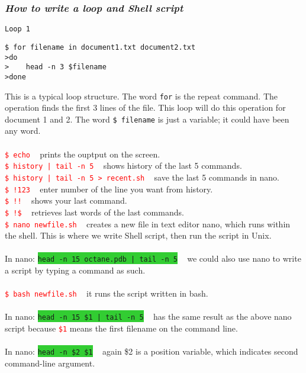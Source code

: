 \documentclass{article}
\begin{document}
{\subsubsection{\small\textsl{How to write a loop and Shell script }}
\texttt{Loop 1}
\begin{lstlisting}
$ for filename in document1.txt document2.txt
>do
>    head -n 3 $filename
>done
\end{lstlisting}
This is a typical loop structure. The word \texttt{for} is the repeat command. The operation finds the first 3 lines of the file. This loop will do this operation for document 1 and 2. The word \texttt{\$ filename} is just a variable; it could have been any word.\\
\\
\textcolor{red}{\texttt{\$ echo}} ~ prints the ouptput on the screen.\\
\textcolor{red}{\texttt{\$ history | tail -n 5}} ~ shows history of the last 5 commands.\\
\textcolor{red}{\texttt{\$ history | tail -n 5 > recent.sh}} ~ save the last 5 commands in nano.\\
\textcolor{red}{\texttt{\$ !123}} ~ enter number of the line you want from history. \\
\textcolor{red}{\texttt{\$ !!}} ~ shows your last command.\\
\textcolor{red}{\texttt{\$ !\$}} ~ retrieves last words of the last commands.\\
\textcolor{red}{\texttt{\$ nano newfile.sh}} ~ creates a new file in text editor nano, which runs within the shell. This is where we write Shell script, then run the script in Unix.\\
\\
In nano: \colorbox{LimeGreen}{\texttt{head -n 15 octane.pdb | tail -n 5}} ~ we could also use nano to write a script by typing a command as such. \\
\\
\textcolor{red}{\texttt{\$ bash newfile.sh}} ~ it runs the script written in bash.\\
\\
In nano: \colorbox{LimeGreen}{\texttt{head -n 15 \$1 | tail -n 5}} ~ has the same result as the above nano script because \textcolor{red}{\texttt{\$1}} means the first filename on the command line. \\
\\
In nano: \colorbox{LimeGreen}{\texttt{head -n \$2 \$1}} ~ again \$2 is a position variable, which indicates second command-line argument.\\

}
\end{document}
